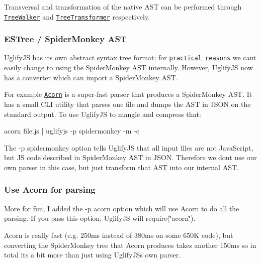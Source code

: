 Transversal and transformation of the native A\+ST can be performed through \href{http://lisperator.net/uglifyjs/walk}{\tt {\ttfamily Tree\+Walker}} and \href{http://lisperator.net/uglifyjs/transform}{\tt {\ttfamily Tree\+Transformer}} respectively.

\subsubsection*{E\+S\+Tree / Spider\+Monkey A\+ST}

Uglify\+JS has its own abstract syntax tree format; for \href{http://lisperator.net/blog/uglifyjs-why-not-switching-to-spidermonkey-ast/}{\tt practical reasons} we can\textquotesingle{}t easily change to using the Spider\+Monkey A\+ST internally. However, Uglify\+JS now has a converter which can import a Spider\+Monkey A\+ST.

For example \href{https://github.com/ternjs/acorn}{\tt Acorn} is a super-\/fast parser that produces a Spider\+Monkey A\+ST. It has a small C\+LI utility that parses one file and dumps the A\+ST in J\+S\+ON on the standard output. To use Uglify\+JS to mangle and compress that\+: \begin{DoxyVerb}acorn file.js | uglifyjs -p spidermonkey -m -c
\end{DoxyVerb}


The {\ttfamily -\/p spidermonkey} option tells Uglify\+JS that all input files are not Java\+Script, but JS code described in Spider\+Monkey A\+ST in J\+S\+ON. Therefore we don\textquotesingle{}t use our own parser in this case, but just transform that A\+ST into our internal A\+ST.

\subsubsection*{Use Acorn for parsing}

More for fun, I added the {\ttfamily -\/p acorn} option which will use Acorn to do all the parsing. If you pass this option, Uglify\+JS will {\ttfamily require(\char`\"{}acorn\char`\"{})}.

Acorn is really fast (e.\+g. 250ms instead of 380ms on some 650K code), but converting the Spider\+Monkey tree that Acorn produces takes another 150ms so in total it\textquotesingle{}s a bit more than just using Uglify\+JS\textquotesingle{}s own parser. 
